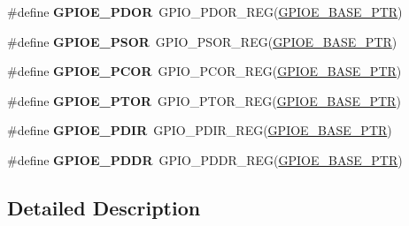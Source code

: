 \begin{DoxyCompactItemize}
\item 
\mbox{\label{group___g_p_i_o___register___accessor___macros_ga0fd55005aebdd6c8348a69fc9961240e}} 
\#define {\bfseries G\+P\+I\+O\+E\+\_\+\+P\+D\+OR}~G\+P\+I\+O\+\_\+\+P\+D\+O\+R\+\_\+\+R\+EG(\hyperlink{group___g_p_i_o___peripheral_ga5d17758f0829d938753761d4a53c0a7c}{G\+P\+I\+O\+E\+\_\+\+B\+A\+S\+E\+\_\+\+P\+TR})
\item 
\mbox{\label{group___g_p_i_o___register___accessor___macros_gab91dcbd2c6ae1b33cc222433e6c0d2a5}} 
\#define {\bfseries G\+P\+I\+O\+E\+\_\+\+P\+S\+OR}~G\+P\+I\+O\+\_\+\+P\+S\+O\+R\+\_\+\+R\+EG(\hyperlink{group___g_p_i_o___peripheral_ga5d17758f0829d938753761d4a53c0a7c}{G\+P\+I\+O\+E\+\_\+\+B\+A\+S\+E\+\_\+\+P\+TR})
\item 
\mbox{\label{group___g_p_i_o___register___accessor___macros_gae47e95a0795236c55495e95b67dc6540}} 
\#define {\bfseries G\+P\+I\+O\+E\+\_\+\+P\+C\+OR}~G\+P\+I\+O\+\_\+\+P\+C\+O\+R\+\_\+\+R\+EG(\hyperlink{group___g_p_i_o___peripheral_ga5d17758f0829d938753761d4a53c0a7c}{G\+P\+I\+O\+E\+\_\+\+B\+A\+S\+E\+\_\+\+P\+TR})
\item 
\mbox{\label{group___g_p_i_o___register___accessor___macros_ga0d6201794a479eb4530b4deedf9f7471}} 
\#define {\bfseries G\+P\+I\+O\+E\+\_\+\+P\+T\+OR}~G\+P\+I\+O\+\_\+\+P\+T\+O\+R\+\_\+\+R\+EG(\hyperlink{group___g_p_i_o___peripheral_ga5d17758f0829d938753761d4a53c0a7c}{G\+P\+I\+O\+E\+\_\+\+B\+A\+S\+E\+\_\+\+P\+TR})
\item 
\mbox{\label{group___g_p_i_o___register___accessor___macros_gab12c5a1580446153a220ff5fadf052bd}} 
\#define {\bfseries G\+P\+I\+O\+E\+\_\+\+P\+D\+IR}~G\+P\+I\+O\+\_\+\+P\+D\+I\+R\+\_\+\+R\+EG(\hyperlink{group___g_p_i_o___peripheral_ga5d17758f0829d938753761d4a53c0a7c}{G\+P\+I\+O\+E\+\_\+\+B\+A\+S\+E\+\_\+\+P\+TR})
\item 
\mbox{\label{group___g_p_i_o___register___accessor___macros_ga4ca5e050e0a711260b6d4dd0d3eabe76}} 
\#define {\bfseries G\+P\+I\+O\+E\+\_\+\+P\+D\+DR}~G\+P\+I\+O\+\_\+\+P\+D\+D\+R\+\_\+\+R\+EG(\hyperlink{group___g_p_i_o___peripheral_ga5d17758f0829d938753761d4a53c0a7c}{G\+P\+I\+O\+E\+\_\+\+B\+A\+S\+E\+\_\+\+P\+TR})
\end{DoxyCompactItemize}


\subsection{Detailed Description}
